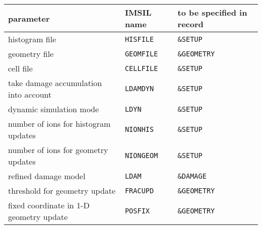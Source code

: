 \begin{center}
\begin{tabular}{lll}
parameter \quad                       & IMSIL name & to be specified in record \\
\hline
histogram file                        & \texttt{HISFILE}  & \texttt{\&SETUP} \\
geometry file                         & \texttt{GEOMFILE} & \texttt{\&GEOMETRY}
\\
cell file                             & \texttt{CELLFILE} & \texttt{\&SETUP} \\
take damage accumulation into account & \texttt{LDAMDYN}  & \texttt{\&SETUP} \\
dynamic simulation mode               & \texttt{LDYN}     & \texttt{\&SETUP} \\
number of ions for histogram updates  & \texttt{NIONHIS}  & \texttt{\&SETUP} \\
number of ions for geometry updates   & \texttt{NIONGEOM} & \texttt{\&SETUP} \\
refined damage model                  & \texttt{LDAM}     & \texttt{\&DAMAGE} \\
threshold for geometry update         & \texttt{FRACUPD}  & \texttt{\&GEOMETRY} \\
fixed coordinate in 1-D geometry update & \texttt{POSFIX}  & \texttt{\&GEOMETRY} \\
\end{tabular}
\end{center}

